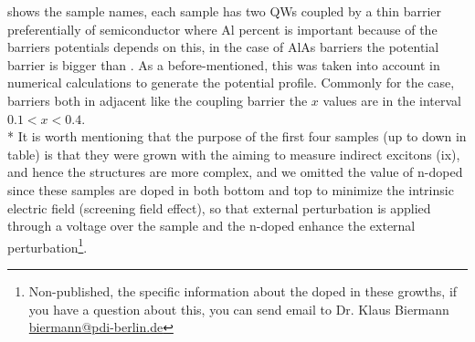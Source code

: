  shows the sample names, each sample has two QWs coupled by a thin barrier preferentially of \algaas semiconductor where Al percent is important because of the barriers potentials depends on this, in the case of AlAs barriers the potential barrier is bigger than \algaas. As a before-mentioned, this was taken into account in numerical calculations to generate the potential profile. Commonly for the case, \algaas barriers both in adjacent like the coupling barrier the $x$ values are in the interval $0.1<x<0.4$.\\*
It is worth mentioning that the purpose of the first four samples (up to down in table) is that they
were grown with the aiming to measure indirect excitons (\gls{ix}), and hence the structures
are more complex, and we omitted the value of n-doped since these samples are doped
in both  bottom and top to minimize the intrinsic electric field (screening field effect), so that
external perturbation is applied through a voltage over the sample\cite{yuan2018tunneling} and the n-doped
enhance the external perturbation\footnote{Non-published, the specific information about the doped  in these growths, if you have a question about this, you can send email to Dr. Klaus Biermann \url{biermann@pdi-berlin.de}}.

